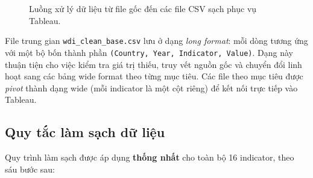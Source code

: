 \begin{figure}[H]
\centering
{}
\caption{Luồng xử lý dữ liệu từ file gốc đến các file CSV sạch phục vụ Tableau.}
\label{fig:pipeline-flow}
\end{figure}

File trung gian \texttt{wdi\_clean\_base.csv} lưu ở dạng \textit{long format}: mỗi dòng tương ứng với một bộ bốn thành phần \texttt{(Country, Year, Indicator, Value)}. Dạng này thuận tiện cho việc kiểm tra giá trị thiếu, truy vết nguồn gốc và chuyển đổi linh hoạt sang các bảng wide format theo từng mục tiêu. Các file theo mục tiêu được \textit{pivot} thành dạng wide (mỗi indicator là một cột riêng) để kết nối trực tiếp vào Tableau.

\subsection{Quy tắc làm sạch dữ liệu}

Quy trình làm sạch được áp dụng \textbf{thống nhất} cho toàn bộ 16 indicator, theo sáu bước sau:

